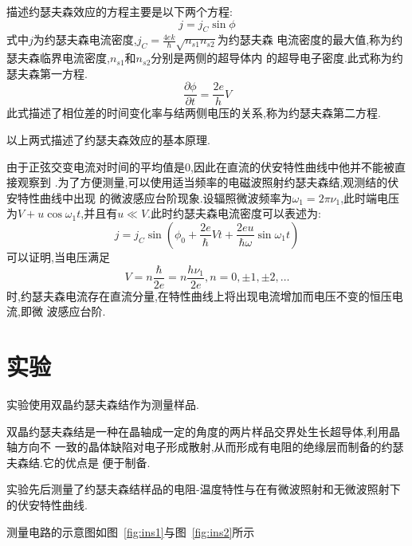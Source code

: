 \documentclass[aps,pre,12pt,preprint,onecolumn,showpacs,showkeys]{revtex4-1}
\begin{document}
描述约瑟夫森效应的方程主要是以下两个方程:
\begin{equation}
    j = j_C\sin\phi
\end{equation}
式中$j$为约瑟夫森电流密度,$j_C = \frac{4ek}{\hbar}\sqrt{n_{s1}n_{s2}}$为约瑟夫森
电流密度的最大值,称为约瑟夫森临界电流密度,$n_{s1}$和$n_{s2}$分别是两侧的超导体内
的超导电子密度.此式称为约瑟夫森第一方程.
\begin{equation}
    \frac{\partial \phi}{\partial t } =  \frac{2e}{h}V
\end{equation}
此式描述了相位差的时间变化率与结两侧电压的关系,称为约瑟夫森第二方程.

以上两式描述了约瑟夫森效应的基本原理.

由于正弦交变电流对时间的平均值是0,因此在直流的伏安特性曲线中他并不能被直接观察到
.为了方便测量,可以使用适当频率的电磁波照射约瑟夫森结,观测结的伏安特性曲线中出现
的微波感应台阶现象.设辐照微波频率为$\omega_1 = 2\pi\nu_1$,此时端电压为$V +
u\cos{\omega_1 t}$,并且有$u \ll V$.此时约瑟夫森电流密度可以表述为:
\begin{equation}
    j = j_C\sin{\left(\phi_0 +\frac{2e}{\hbar}Vt +
        \frac{2eu}{\hbar\omega}\sin{\omega_1t}\right)}
\end{equation}
可以证明,当电压满足
\begin{equation}
V = n \frac{\hbar}{2e} = n\frac{h\nu_1}{2e}, n = 0, \pm 1, \pm 2, \dots
\end{equation}
时,约瑟夫森电流存在直流分量,在特性曲线上将出现电流增加而电压不变的恒压电流,即微
波感应台阶.

\section{实验}

实验使用双晶约瑟夫森结作为测量样品.

双晶约瑟夫森结是一种在晶轴成一定的角度的两片样品交界处生长超导体,利用晶轴方向不
一致的晶体缺陷对电子形成散射,从而形成有电阻的绝缘层而制备的约瑟夫森结.它的优点是
便于制备.

实验先后测量了约瑟夫森结样品的电阻-温度特性与在有微波照射和无微波照射下的伏安特性曲线.

测量电路的示意图如图~\ref{fig:ins1}与图~\ref{fig:ins2}所示
\end{document}
